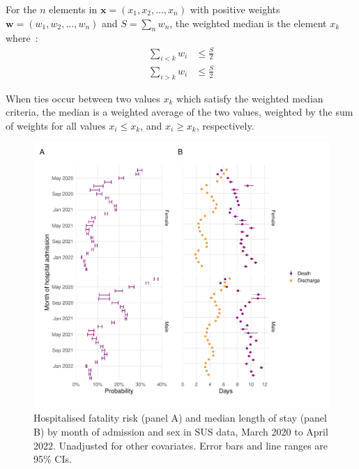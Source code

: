 For the $n$ elements in $\bm{x} = (x_1, x_2, \ldots, x_n)$ with positive weights $\bm{w} = (w_1, w_2, \ldots, w_n)$ and $S = \sum_n w_n$, the weighted median is the element $x_k$ where~\parencite{Cormen2022-pi}:
%
\begin{align*}
    \sum_{i<k} w_i & \leq \frac{S}{2} \\
    \sum_{i>k} w_i & \leq \frac{S}{2}
\end{align*}

When ties occur between two values $x_k$ which satisfy the weighted median criteria, the median is a weighted average of the two values, weighted by the sum of weights for all values $x_i \leq x_k$, and $x_i \geq x_k$, respectively.

\begingroup\footnotesize

\endgroup

\begin{figure}[htbp!]
    \centering
    \includegraphics[width=\textwidth]{hfr_month_sex.pdf}
    \caption[Hospitalised fatality risk and median length of stay by month of admission and sex in SUS data, March 2020 to April 2022]{Hospitalised fatality risk (panel A) and median length of stay (panel B) by month of admission and sex in SUS data, March 2020 to April 2022. Unadjusted for other covariates. Error bars and line ranges are 95\% CIs.}
\end{figure}

